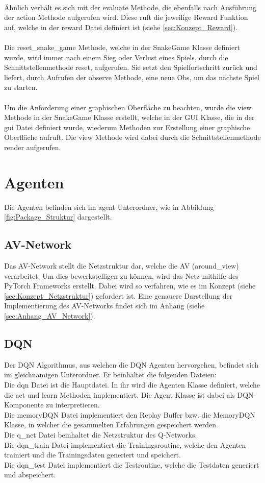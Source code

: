 \\Ähnlich verhält es sich mit der evaluate Methode, die ebenfalls nach Ausführung der action Methode aufgerufen wird. Diese ruft die jeweilige Reward Funktion auf, welche in der reward Datei definiert ist (siehe \ref{sec:Konzept_Reward}).\\
\\Die reset\_snake\_game Methode, welche in der SnakeGame Klasse definiert wurde, wird immer nach einem Sieg oder Verlust eines Spiels, durch die Schnittstellenmethode reset, aufgerufen. Sie setzt den Spielfortschritt zurück und liefert, durch Aufrufen der observe Methode, eine neue Obs, um das nächste Spiel zu starten.\\
\\Um die Anforderung einer graphischen Oberfläche zu beachten, wurde die view Methode in der SnakeGame Klasse erstellt, welche in der GUI Klasse, die in der gui Datei definiert wurde, wiederum Methoden zur Erstellung einer graphische Oberfläche aufruft. Die view Methode wird dabei durch die Schnittstellenmethode render aufgerufen.

\section{Agenten}
Die Agenten befinden sich im agent Unterordner, wie in Abbildung \ref{fig:Package_Struktur} dargestellt.

\subsection{AV-Network} \label{sec:Implementierung_AV_Network}
Das AV-Network stellt die Netzstruktur dar, welche die AV (around\_view) verarbeitet. Um dies bewerkstelligen zu können, wird das Netz mithilfe des PyTorch Frameworks erstellt. Dabei wird so verfahren, wie es im Konzept (siehe \ref{sec:Konzept_Netzstruktur}) gefordert ist. Eine genauere Darstellung der Implementierung des AV-Networks findet sich im Anhang (siehe \ref{sec:Anhang_AV_Network}).

\subsection{DQN}
Der DQN Algorithmus, aus welchen die DQN Agenten hervorgehen, befindet sich im gleichnamigen Unterordner. Er beinhaltet die folgenden Dateien:\\
Die dqn Datei ist die Hauptdatei. In ihr wird die Agenten Klasse definiert, welche die act und learn Methoden implementiert. Die Agent Klasse ist dabei als DQN-Komponente zu interpretieren.\\
Die memoryDQN Datei implementiert den Replay Buffer bzw. die MemoryDQN Klasse, in welcher die gesammelten Erfahrungen gespeichert werden.\\
Die q\_net Datei beinhaltet die Netzstruktur des Q-Networks.\\
Die dqn\_train Datei implementiert die Trainingsroutine, welche den Agenten trainiert und die Trainingsdaten generiert und speichert.\\
Die dqn\_test Datei implementiert die Testroutine, welche die Testdaten generiert und abspeichert.

